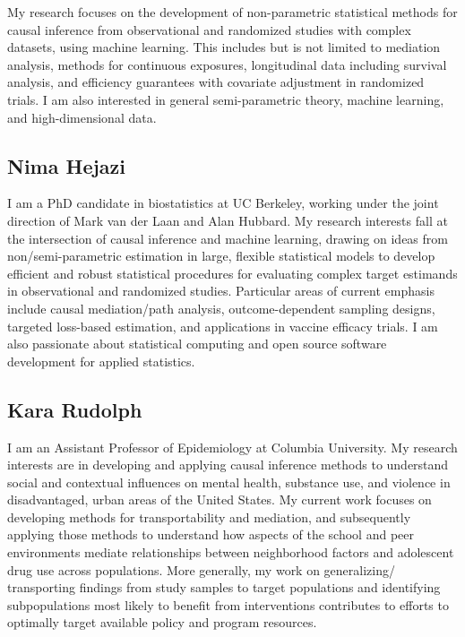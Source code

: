\documentclass[
  12pt, krantz2,
]{book}
\theoremstyle{definition}
\theoremstyle{definition}
\theoremstyle{definition}
\newcommand{\1}{\mathbbm{1}}
\begin{document}
My research focuses on the development of non-parametric statistical methods for
causal inference from observational and randomized studies with complex
datasets, using machine learning. This includes but is not limited to mediation
analysis, methods for continuous exposures, longitudinal data including survival
analysis, and efficiency guarantees with covariate adjustment in randomized
trials. I am also interested in general semi-parametric theory, machine
learning, and high-dimensional data.

\hypertarget{nima-hejazi}{%
\subsection*{Nima Hejazi}\label{nima-hejazi}}


I am a PhD candidate in biostatistics at UC Berkeley, working under the joint
direction of Mark van der Laan and Alan Hubbard. My research interests fall at
the intersection of causal inference and machine learning, drawing on ideas from
non/semi-parametric estimation in large, flexible statistical models to develop
efficient and robust statistical procedures for evaluating complex target
estimands in observational and randomized studies. Particular areas of current
emphasis include causal mediation/path analysis, outcome-dependent sampling
designs, targeted loss-based estimation, and applications in vaccine efficacy
trials. I am also passionate about statistical computing and open source
software development for applied statistics.

\hypertarget{kara-rudolph}{%
\subsection*{Kara Rudolph}\label{kara-rudolph}}


I am an Assistant Professor of Epidemiology at Columbia University. My research
interests are in developing and applying causal inference methods to understand
social and contextual influences on mental health, substance use, and violence
in disadvantaged, urban areas of the United States. My current work focuses on
developing methods for transportability and mediation, and subsequently applying
those methods to understand how aspects of the school and peer environments
mediate relationships between neighborhood factors and adolescent drug use
across populations. More generally, my work on generalizing/ transporting
findings from study samples to target populations and identifying subpopulations
most likely to benefit from interventions contributes to efforts to optimally
target available policy and program resources.
\end{document}
